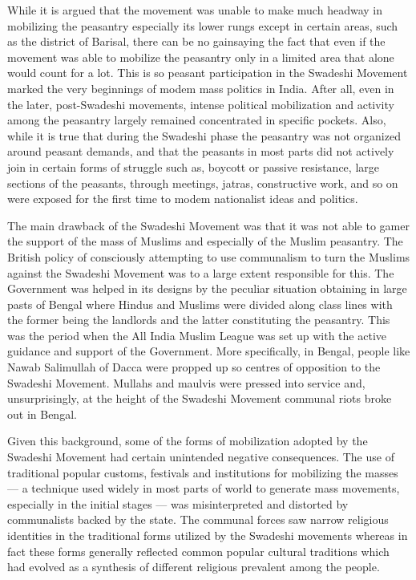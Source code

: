 While it is argued that the movement was unable to make much headway in mobilizing the peasantry especially its lower rungs except in certain areas, such as the district of Barisal, there can be no gainsaying the fact that even if the movement was able to mobilize the peasantry only in a limited area that alone would count for a lot. This is so peasant participation in the Swadeshi Movement marked the very beginnings of modem mass politics in India. After all, even in the later, post-Swadeshi movements, intense political mobilization and activity among the peasantry largely remained concentrated in specific pockets. Also, while it is true that during the Swadeshi phase the peasantry was not organized around peasant demands, and that the peasants in most parts did not actively join in certain forms of struggle such as, boycott or passive resistance, large sections of the peasants, through meetings, jatras, constructive work, and so on were exposed for the first time to modem nationalist ideas and politics.

The main drawback of the Swadeshi Movement was that it was not able to gamer the support of the mass of Muslims and especially of the Muslim peasantry. The British policy of consciously attempting to use communalism to turn the Muslims against the Swadeshi Movement was to a large extent responsible for this. The Government was helped in its designs by the peculiar situation obtaining in large pasts of Bengal where Hindus and Muslims were divided along class lines with the former being the landlords and the latter constituting the peasantry. This was the period when the All India Muslim League was set up with the active guidance and support of the Government. More specifically, in Bengal, people like Nawab Salimullah of Dacca were propped up so centres of opposition to the Swadeshi Movement. Mullahs and maulvis were pressed into service and, unsurprisingly, at the height of the Swadeshi Movement communal riots broke out in Bengal.

Given this background, some of the forms of mobilization adopted by the Swadeshi Movement had certain unintended negative consequences. The use of traditional popular customs, festivals and institutions for mobilizing the masses --- a technique used widely in most parts of world to generate mass movements, especially in the initial stages --- was misinterpreted and distorted by communalists backed by the state. The communal forces saw narrow religious identities in the traditional forms utilized by the Swadeshi movements whereas in fact these forms generally reflected common popular cultural traditions which had evolved as a synthesis of different religious prevalent among the people.

